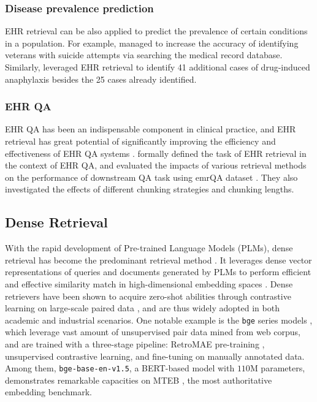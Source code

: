 \subsubsection{Disease prevalence prediction}
EHR retrieval can be also applied to predict the prevalence of certain conditions in a population.
For example, \citet{hammond2013use} managed to increase the accuracy of identifying veterans with suicide attempts via searching the medical record database. 
Similarly, \citet{bouzille2018drug} leveraged EHR retrieval to identify 41 additional cases of drug-induced anaphylaxis besides the 25 cases already identified. 

\subsubsection{EHR QA}
EHR QA has been an indispensable component in clinical practice, and EHR retrieval has great potential of significantly improving the efficiency and effectiveness of EHR QA systems \cite{Lanz2024ParagraphRF}.
\citet{Lanz2024ParagraphRF} formally defined the task of EHR retrieval in the context of EHR QA, and evaluated the impacts of various retrieval methods on the performance of downstream QA task using emrQA dataset \cite{Pampari2018emrQAAL}.
They also investigated the effects of different chunking strategies and chunking lengths.

\subsection{Dense Retrieval}
With the rapid development of Pre-trained Language Models (PLMs), dense retrieval has become the predominant retrieval method \cite{neelakantan2022text, Li2023TowardsGT, lee2024nv}.
It leverages dense vector representations of queries and documents generated by PLMs to perform efficient and effective similarity match in high-dimensional embedding spaces \cite{karpukhin2020dense}.
Dense retrievers have been shown to acquire zero-shot abilities through contrastive learning on large-scale paired data \cite{ni2021large, ying2024cortex}, and are thus widely adopted in both academic and industrial scenarios.
One notable example is the \texttt{bge} series models \cite{bge_embedding}, which leverage vast amount of unsupervised pair data mined from web corpus, and are trained with a three-stage pipeline: RetroMAE pre-training \cite{Xiao2022RetroMAEPR}, unsupervised contrastive learning, and fine-tuning on manually annotated data.
Among them, \texttt{bge-base-en-v1.5}, a BERT-based \cite{bert} model with $110$M parameters, demonstrates remarkable capacities on MTEB \cite{muennighoff2022mteb}, the most authoritative embedding benchmark. 

